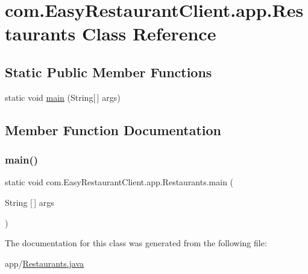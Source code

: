 \hypertarget{classcom_1_1_easy_restaurant_client_1_1app_1_1_restaurants}{}\section{com.\+Easy\+Restaurant\+Client.\+app.\+Restaurants Class Reference}
\label{classcom_1_1_easy_restaurant_client_1_1app_1_1_restaurants}
\subsection*{Static Public Member Functions}
\begin{DoxyCompactItemize}
\item 
static void \mbox{\hyperlink{classcom_1_1_easy_restaurant_client_1_1app_1_1_restaurants_a61f71633736d2ce9aba631985cdc3428}{main}} (String\mbox{[}$\,$\mbox{]} args)
\end{DoxyCompactItemize}


\subsection{Member Function Documentation}
\mbox{\label{classcom_1_1_easy_restaurant_client_1_1app_1_1_restaurants_a61f71633736d2ce9aba631985cdc3428}} 
\subsubsection{\texorpdfstring{main()}{main()}}
{\footnotesize\ttfamily static void com.\+Easy\+Restaurant\+Client.\+app.\+Restaurants.\+main (\begin{DoxyParamCaption}\item[{String \mbox{[}$\,$\mbox{]}}]{args }\end{DoxyParamCaption})\hspace{0.3cm}{\ttfamily [static]}}



The documentation for this class was generated from the following file\+:\begin{DoxyCompactItemize}
\item 
app/\mbox{\hyperlink{_restaurants_8java}{Restaurants.\+java}}\end{DoxyCompactItemize}
